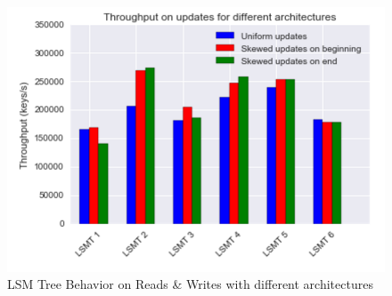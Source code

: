 \documentclass{sig-alternate-05-2015}
\begin{document}
\begin{figure}
\begin{minipage}[b]{0.3\textwidth}
    \includegraphics[width=\textwidth]{archi_udpates}
  \end{minipage}
  \caption{LSM Tree Behavior on Reads \& Writes with different architectures}
  \label{fig:archi}
  

\end{figure}
\end{document}
